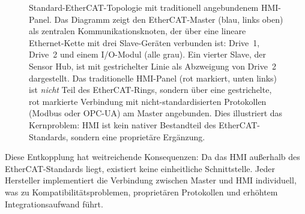 ﻿\documentclass[12pt,a4paper]{article}
\begin{document}
\begin{figure}[H]
\centering
{}
\caption{Standard-EtherCAT-Topologie mit traditionell angebundenem HMI-Panel. Das
  Diagramm zeigt den EtherCAT-Master (blau, links oben) als zentralen Kommunikationsknoten,
  der über eine lineare Ethernet-Kette mit drei Slave-Geräten verbunden ist: Drive~1,
  Drive~2 und einem I/O-Modul (alle grau). Ein vierter Slave, der Sensor Hub, ist mit
  gestrichelter Linie als Abzweigung von Drive~2 dargestellt. Das traditionelle HMI-Panel
  (rot markiert, unten links) ist \emph{nicht} Teil des EtherCAT-Rings, sondern über eine
  gestrichelte, rot markierte Verbindung mit nicht-standardisierten Protokollen (Modbus oder
  OPC-UA) am Master angebunden. Dies illustriert das Kernproblem: HMI ist kein nativer
  Bestandteil des EtherCAT-Standards, sondern eine proprietäre Ergänzung.}
\label{fig:ethercat_topology}
\end{figure}

Diese Entkopplung hat weitreichende Konsequenzen: Da das HMI au\ss{}erhalb des
EtherCAT-Standards liegt, existiert keine einheitliche Schnittstelle. Jeder Hersteller
implementiert die Verbindung zwischen Master und HMI individuell, was zu
Kompatibilitätsproblemen, proprietären Protokollen und erhöhtem Integrationsaufwand führt.
\end{document}
